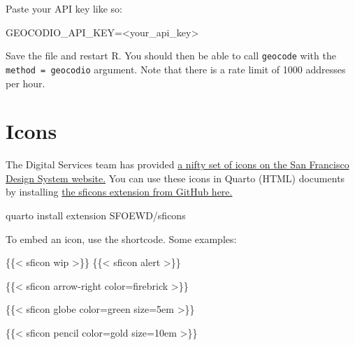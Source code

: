 \documentclass[
  letterpaper,
  DIV=11,
  numbers=noendperiod]{scrreprt}
\newenvironment{Shaded}{\begin{snugshade}}{\end{snugshade}}
\newcommand{\DecValTok}[1]{\textcolor[rgb]{0.68,0.00,0.00}{#1}}
\newcommand{\ExtensionTok}[1]{\textcolor[rgb]{0.00,0.23,0.31}{#1}}
\newcommand{\NormalTok}[1]{\textcolor[rgb]{0.00,0.23,0.31}{#1}}
\newcommand{\OperatorTok}[1]{\textcolor[rgb]{0.37,0.37,0.37}{#1}}
\newcommand{\OtherTok}[1]{\textcolor[rgb]{0.00,0.23,0.31}{#1}}
\newcommand{\SpecialCharTok}[1]{\textcolor[rgb]{0.37,0.37,0.37}{#1}}
\newcommand{\StringTok}[1]{\textcolor[rgb]{0.13,0.47,0.30}{#1}}
\newcommand{\VariableTok}[1]{\textcolor[rgb]{0.07,0.07,0.07}{#1}}
\begin{document}
Paste your API key like so:

\begin{Shaded}
\begin{Highlighting}[]
\VariableTok{GEOCODIO\_API\_KEY}\OperatorTok{=}\StringTok{\textquotesingle{}\textless{}your\_api\_key\textgreater{}\textquotesingle{}}
\end{Highlighting}
\end{Shaded}

Save the file and restart R. You should then be able to call
\texttt{geocode} with the
\texttt{method\ =\ \textquotesingle{}geocodio\textquotesingle{}}
argument. Note that there is a rate limit of 1000 addresses per hour.


\chapter{Icons}\label{icons}

The Digital Services team has provided
\href{https://design-system.sf.gov/components/icons/}{a nifty set of
icons on the San Francisco Design System website.} You can use these
icons in Quarto (HTML) documents by installing
\href{https://github.com/SFOEWD/sficons?tab=readme-ov-file}{the sficons
extension from GitHub here.}

\begin{Shaded}
\begin{Highlighting}[]
\ExtensionTok{quarto}\NormalTok{ install extension SFOEWD/sficons}
\end{Highlighting}
\end{Shaded}

To embed an icon, use the \texttt{} shortcode. Some examples:

\begin{Shaded}
\begin{Highlighting}[]
\NormalTok{\{\{}\SpecialCharTok{\textless{}}\NormalTok{ sficon wip }\SpecialCharTok{\textgreater{}}\NormalTok{\}\}}
\NormalTok{\{\{}\SpecialCharTok{\textless{}}\NormalTok{ sficon alert }\SpecialCharTok{\textgreater{}}\NormalTok{\}\}}
\end{Highlighting}
\end{Shaded}

\begin{Shaded}
\begin{Highlighting}[]
\NormalTok{\{\{}\SpecialCharTok{\textless{}}\NormalTok{ sficon arrow}\SpecialCharTok{{-}}\NormalTok{right color}\OtherTok{=}\NormalTok{firebrick }\SpecialCharTok{\textgreater{}}\NormalTok{\}\}}

\NormalTok{\{\{}\SpecialCharTok{\textless{}}\NormalTok{ sficon globe color}\OtherTok{=}\NormalTok{green size}\OtherTok{=}\DecValTok{5}\NormalTok{em }\SpecialCharTok{\textgreater{}}\NormalTok{\}\}}

\NormalTok{\{\{}\SpecialCharTok{\textless{}}\NormalTok{ sficon pencil color}\OtherTok{=}\NormalTok{gold size}\OtherTok{=}\DecValTok{10}\NormalTok{em }\SpecialCharTok{\textgreater{}}\NormalTok{\}\}}
\end{Highlighting}
\end{Shaded}
\end{document}
